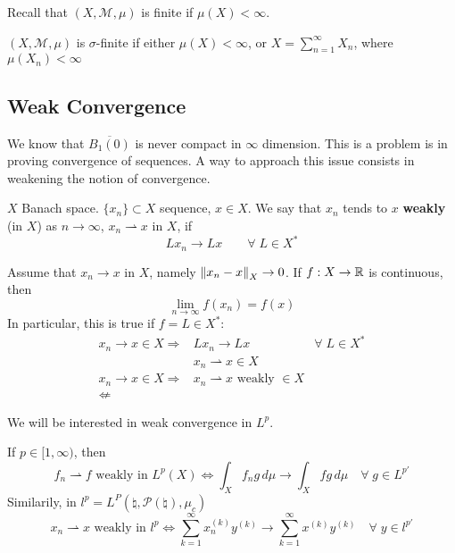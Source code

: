 Recall that \((X, \mathcal{M}, \mu)\) is finite if \(\mu(X) < \infty\).

\begin{definition}
    \((X, \mathcal{M}, \mu)\) is \(\sigma\)-finite if either \(\mu(X) < \infty\), or \(X = \sum_{n=1}^\infty X_n\), where \(\mu(X_n) < \infty\)
\end{definition}

\subsection*{Weak Convergence}

We know that \(\overline{B_1(0)}\) is never compact in \(\infty\) dimension. This is a problem is in proving convergence of sequences. A way to approach this issue consists in weakening the notion of convergence.
\begin{definition}
    \(X\) Banach space. \(\{x_n\} \subset X\) sequence, \(x \in X\). We say that \(x_n\) tends to \(x\) \textbf{weakly} (in \(X\)) as \(n \to \infty\), \(x_n \rightharpoonup x\) in \(X\), if 
    \[
        L x_n \to Lx \qquad \forall \; L \in X^*
    \]
\end{definition}
\begin{remark}
    Assume that \(x_n \to x\) in \(X\), namely \(\norm{x_n -x}_X \to 0\). If \(f:X \to \mathbb{R}\) is continuous, then
    \[
        \lim_{n \to \infty} f(x_n) = f(x)
    \]
    In particular, this is true if \(f = L \in X^*\):
    \[
        \begin{array}{rlc}
            x_n \to x \in X \Rightarrow & L x_n \to Lx & \forall\; L \in X^* \\
            & x_n \rightharpoonup x \in X & \\
            x_n \to x \in X \Rightarrow & x_n \rightharpoonup x \text{ weakly } \in X & \\
             \nLeftarrow & 
        \end{array}
    \]
\end{remark}
\begin{remark}
    We will be interested in weak convergence in \(L^p\). 
    
    \noindent If \(p \in [1, \infty)\), then 
    \[
        f_n \rightharpoonup f \text{ weakly in } L^p(X) \iff \int_X f_n g \, d\mu \to \int_X fg \, d\mu \quad \forall \; g \in L^{p'}
    \]
    \noindent Similarily, in \(l^p = L^P(\natural, \mathcal{P}(\natural), \mu_c)\)
    \[
        x_n \rightharpoonup x \text{ weakly in } l^p \iff \sum_{k=1}^\infty x_n^{(k)} y^{(k)} \to \sum_{k=1}^\infty x^{(k)} y^{(k)} \quad \forall \; y \in l^{p'}
    \]
\end{remark}

